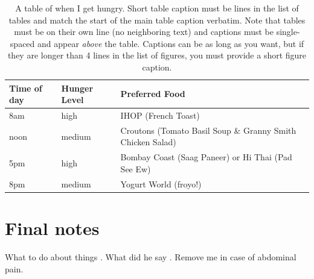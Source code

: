 \documentclass[12pt,chapterheads]{ucsd}
\begin{document}
\vspace{0.25in}
\begin{table}[!ht]
\caption[A table of when I get hungry.  Short table caption must be  lines in the list of tables]{A table of when I get hungry. Short table caption must be  lines in the list of tables and match the start of the main table caption verbatim.  Note that tables must be on their own line (no neighboring text) and captions must be single-spaced and appear \protect\textit{above} the table.  Captions can be as long as you want, but if they are longer than 4 lines in the list of figures, you must provide a short figure caption.}

\vspace{-0.25in}
\begin{center}
\begin{tabular}{|p{1in}|p{2in}|p{3in}|}

\hline
Time of day & Hunger Level & Preferred Food \\

\hline
8am & high & IHOP (French Toast) \\

\hline
noon & medium & Croutons (Tomato Basil Soup \& Granny Smith Chicken Salad) \\

\hline
5pm & high & Bombay Coast (Saag Paneer) or Hi Thai (Pad See Ew) \\

\hline
8pm & medium & Yogurt World (froyo!) \\

\hline
\end{tabular}
\end{center}
\label{tab:analysis3}
\end{table}



\appendix
\chapter{Final notes}
What to do about things \cite{Martin_1983}.  What did he say \cite{Rilling_Insel_1999}.
  Remove me in case of abdominal pain.



\end{document}
